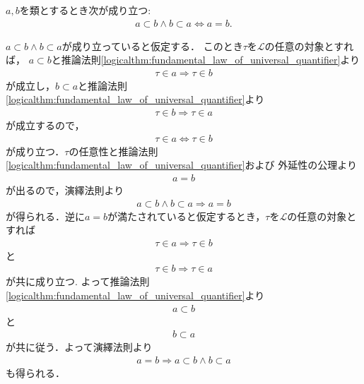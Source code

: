 	\begin{screen}
		\begin{thm}[互いに互いの部分類となる類同士は等しい]\label{thm:mutually_sub_classes_are_equivalent}
			$a,b$を類とするとき次が成り立つ:
			\begin{align}
				a \subset b \wedge b \subset a \Longleftrightarrow a = b.
			\end{align}
		\end{thm}
	\end{screen}
	
	\begin{sketch}
		$a \subset b \wedge b \subset a$が成り立っていると仮定する．
		このとき$\tau$を$\mathcal{L}$の任意の対象とすれば，
		$a \subset b$と推論法則\ref{logicalthm:fundamental_law_of_universal_quantifier}より
		\begin{align}
			\tau \in a \Longrightarrow \tau \in b
		\end{align}
		が成立し，$b \subset a$と推論法則\ref{logicalthm:fundamental_law_of_universal_quantifier}より
		\begin{align}
			\tau \in b \Longrightarrow \tau \in a
		\end{align}
		が成立するので，
		\begin{align}
			\tau \in a \Longleftrightarrow \tau \in b
		\end{align}
		が成り立つ．$\tau$の任意性と推論法則\ref{logicalthm:fundamental_law_of_universal_quantifier}および
		外延性の公理より
		\begin{align}
			a = b
		\end{align}
		が出るので，演繹法則より
		\begin{align}
			a \subset b \wedge b \subset a \Longrightarrow a = b
		\end{align}
		が得られる．逆に$a = b$が満たされていると仮定するとき，$\tau$を$\mathcal{L}$の任意の対象とすれば
		\begin{align}
			\tau \in a \Longrightarrow \tau \in b
		\end{align}
		と
		\begin{align}
			\tau \in b \Longrightarrow \tau \in a
		\end{align}
		が共に成り立つ. よって推論法則\ref{logicalthm:fundamental_law_of_universal_quantifier}より
		\begin{align}
			a \subset b
		\end{align}
		と
		\begin{align}
			b \subset a
		\end{align}
		が共に従う．よって演繹法則より
		\begin{align}
			a = b \Longrightarrow a \subset b \wedge b \subset a
		\end{align}
		も得られる．
		\QED
	\end{sketch}
	
